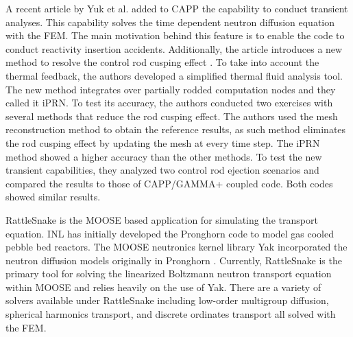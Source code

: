 \documentclass[11pt,letterpaper]{article}
\begin{document}
A recent article by Yuk et al. \cite{yuk_time-dependent_2020} added to CAPP the capability to conduct transient analyses.
This capability solves the time dependent neutron diffusion equation with the \gls{FEM}.
The main motivation behind this feature is to enable the code to conduct reactivity insertion accidents.
Additionally, the article introduces a new method to resolve the control rod cusping effect \cite{joo_resolution_1984}.
To take into account the thermal feedback, the authors developed a simplified thermal fluid analysis tool.
The new method integrates over partially rodded computation nodes and they called it iPRN.
To test its accuracy, the authors conducted two exercises with several methods that reduce the rod cusping effect.
The authors used the mesh reconstruction method to obtain the reference results, as such method eliminates the rod cusping effect by updating the mesh at every time step.
The iPRN method showed a higher accuracy than the other methods.
To test the new transient capabilities, they analyzed two control rod ejection scenarios and compared the results to those of CAPP/GAMMA+ coupled code.
Both codes showed similar results.

RattleSnake \cite{wang_rattlesnake_2019} is the MOOSE \cite{gaston_moose_2009} based application for simulating the transport equation.
\gls{INL} has initially developed the Pronghorn code to model gas cooled pebble bed reactors.
The MOOSE neutronics kernel library Yak incorporated the neutron diffusion models originally in Pronghorn \cite{strydom_inl_2013}.
Currently, RattleSnake is the primary tool for solving the linearized Boltzmann neutron transport equation within MOOSE and relies heavily on the use of Yak.
There are a variety of solvers available under RattleSnake including low-order multigroup diffusion, spherical harmonics transport, and discrete ordinates transport all solved with the \gls{FEM}.
\end{document}
